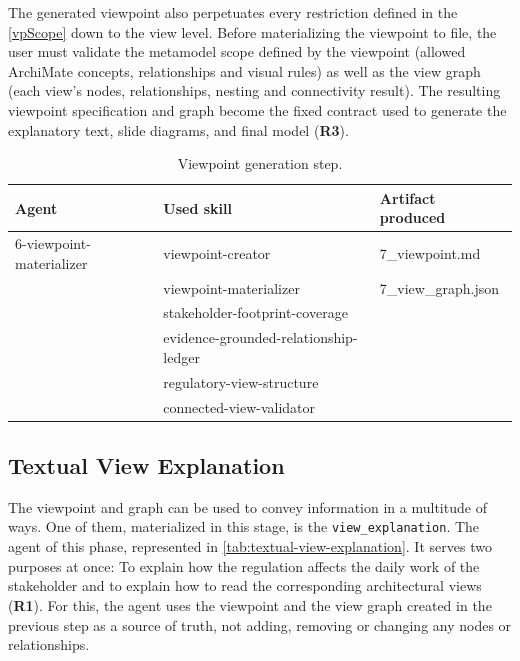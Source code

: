 The generated viewpoint also perpetuates every restriction defined in the \ref{vpScope} down to the view level. Before materializing the viewpoint to file, the user must validate the metamodel scope defined by the viewpoint (allowed ArchiMate concepts, relationships and visual rules) as well as the view graph (each view's nodes, relationships, nesting and connectivity result).
The resulting viewpoint specification and graph become the fixed contract used to generate the explanatory text, slide diagrams, and final model (\textbf{R3}).

\begin{table}[h]
\centering
\small
\begin{tabular}{p{5.2cm} p{5.5cm} p{3.5cm}}
\hline
\textbf{Agent} & \textbf{Used skill} & \textbf{Artifact produced} \\
\hline
6-viewpoint-materializer &
viewpoint-creator &
7\_viewpoint.md \\
 &
viewpoint-materializer &
7\_view\_graph.json \\
 &
stakeholder-footprint-coverage &
\\
 &
evidence-grounded-relationship-ledger &
\\
 &
regulatory-view-structure &
\\
 &
connected-view-validator &
\\
\hline
\end{tabular}
\caption{Viewpoint generation step.}
\label{tab:viewpoint-generation}
\end{table}

\subsection{Textual View Explanation}

The viewpoint and graph can be used to convey information in a multitude of ways. One of them, materialized in this stage, is the \texttt{view\_explanation}. The agent of this phase, represented in \ref{tab:textual-view-explanation}. It serves two purposes at once: To explain how the regulation affects the daily work of the stakeholder and to explain how to read the corresponding architectural views (\textbf{R1}). For this, the agent uses the viewpoint and the view graph created in the previous step as a source of truth, not adding, removing or changing any nodes or relationships.

